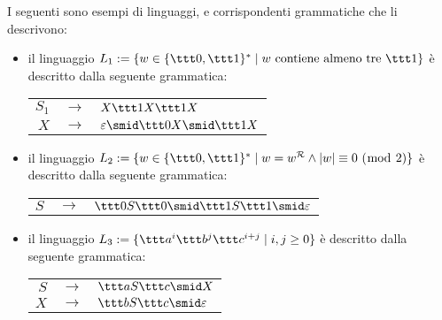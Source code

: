 \documentclass[a4paper, 12pt]{report}
\begin{document}
    \begin{example}
        I seguenti sono esempi di linguaggi, e corrispondenti grammatiche che li descrivono:

        \begin{itemize}
            \item il linguaggio $L_1 := \{w \in \{\ttt 0, \ttt 1\}^* \mid w \ \mathrm{contiene \ almeno \ tre \ \ttt 1}\}$ è descritto dalla seguente grammatica:

                \begin{center}
                    \begin{tabular}{rcl}
                        $S_1$ & $\to$ & $X \ttt 1 X \ttt 1 X$ \\
                        $X$ & $\to$ &  $\varepsilon \smid \ttt 0 X \smid \ttt 1 X$
                    \end{tabular}
                \end{center}

            \item il linguaggio $L_2 := \{w \in \{\ttt 0, \ttt 1\}^* \mid w = w ^\mathcal{R} \land |w| \equiv 0 \ (\bmod \ 2)\}$ è descritto dalla seguente grammatica:

                \begin{center}
                    \begin{tabular}{rcl}
                        $S$ & $\to$ & $\ttt 0 S \ttt 0 \smid \ttt 1 S \ttt 1 \smid \varepsilon$
                    \end{tabular}
                \end{center}

            \item il linguaggio $L_3 := \{\ttt a^i \ttt b^j \ttt c^{i + j} \mid i, j \ge 0\}$ è descritto dalla seguente grammatica:

                \begin{center}
                    \begin{tabular}{rcl}
                        $S$ & $\to$ & $\ttt a S \ttt c \smid X$ \\ 
                        $X$ & $\to$ & $\ttt b S \ttt c \smid \varepsilon$
                    \end{tabular}
                \end{center}
        \end{itemize}
    \end{example}
\end{document}
